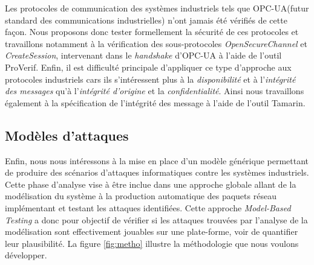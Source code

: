 \documentclass{article}
\newcommand{\proverif}{ProVerif\xspace}
\newcommand{\tamarin}{Tamarin\xspace}
\newcommand{\opcua}{OPC-UA\xspace}
\begin{document}
Les protocoles de communication des systèmes industriels tels que \opcua (futur
standard des communications industrielles) n'ont jamais été vérifiés de cette
façon.
Nous proposons donc tester formellement la sécurité de ces protocoles et
travaillons notamment à la vérification des sous-protocoles {\em OpenSecureChannel}
et {\em CreateSession}, intervenant dans le {\em handshake} d'\opcua à l'aide de
l'outil \proverif.
Enfin, il est difficulté principale d'appliquer ce type d'approche aux protocoles
industriels cars ils s'intéressent plus à la {\em disponibilité} et à 
l'{\em intégrité des messages} qu'à l'{\em intégrité d'origine} et la
{\em confidentialité}.
Ainsi nous travaillons également à la spécification de l'intégrité des message
à l'aide de l'outil \tamarin.

\subsection{Modèles d'attaques}\label{sec:models}


Enfin, nous nous intéressons à la mise en place d'un modèle générique permettant
de produire des scénarios d'attaques informatiques contre les systèmes industriels.
Cette phase d'analyse vise à être inclue dans une approche globale allant de la
modélisation du système à la production automatique des paquets réseau
implémentant et testant les attaques identifiées.
Cette approche {\em Model-Based Testing} a donc pour objectif de vérifier si les
attaques trouvées par l'analyse de la modélisation sont  effectivement jouables
sur une plate-forme, voir de quantifier leur plausibilité.
La figure \ref{fig:metho} illustre la méthodologie que nous voulons développer.
\end{document}
